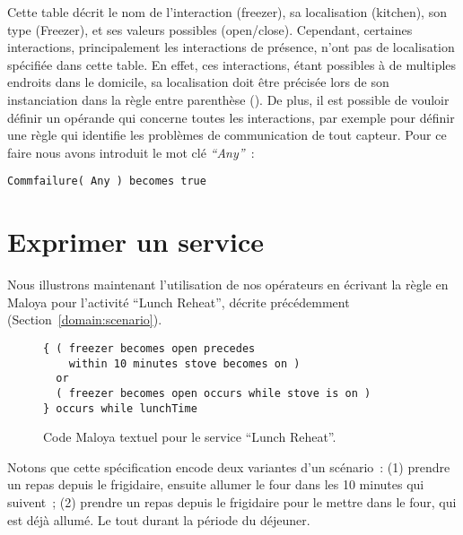 Cette table décrit le nom de l'interaction (\eg freezer), sa localisation (\eg kitchen), son type (\eg Freezer), et ses valeurs possibles (\eg open/close). Cependant, certaines interactions, principalement les interactions de présence, n'ont pas de localisation spécifiée dans cette table. En effet, ces interactions, étant possibles à de multiples endroits dans le domicile, sa localisation doit être précisée lors de son instanciation dans la règle entre parenthèse (). De plus, il est possible de vouloir définir un opérande qui concerne toutes les interactions, par exemple pour définir une règle qui identifie les problèmes de communication de tout capteur. Pour ce faire nous avons introduit le mot clé {\em ``Any''}~:
\begin{lstlisting}[language=MaloyaText]
Commfailure( Any ) becomes true
\end{lstlisting}

\section{Exprimer un service}
Nous illustrons maintenant l'utilisation de nos opérateurs en écrivant la règle 
en Maloya pour l'activité ``Lunch Reheat'', décrite précédemment (Section~\ref{domain:scenario}). 
\begin{figure}[h]
\begin{lstlisting}[language=MaloyaText,frame=bt]
{ ( freezer becomes open precedes 
    within 10 minutes stove becomes on )
  or
  ( freezer becomes open occurs while stove is on ) 
} occurs while lunchTime
\end{lstlisting}
\caption{Code Maloya textuel pour le service ``Lunch Reheat''.}
\label{listing:maloyaText_reheat}
\end{figure}

Notons que cette spécification encode deux variantes d'un scénario~: (1) prendre 
un repas depuis le frigidaire, ensuite allumer le four dans les 10 minutes qui suivent~; (2) prendre un repas 
depuis le frigidaire pour le mettre dans le four, qui est déjà allumé. Le tout durant la période du déjeuner.


